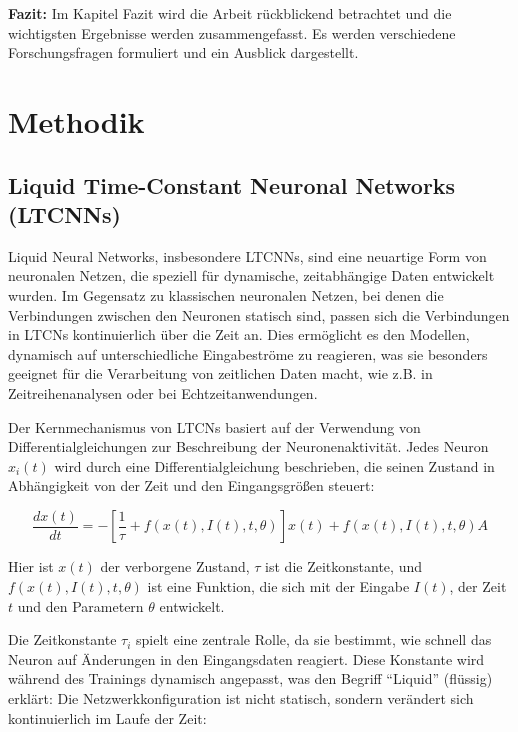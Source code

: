 \documentclass[11pt,ngerman,a4paper,]{article}
\begin{document}
\textbf{Fazit:} Im Kapitel Fazit wird die Arbeit rückblickend betrachtet und die wichtigsten Ergebnisse werden zusammengefasst. Es werden verschiedene Forschungsfragen formuliert und ein Ausblick dargestellt.

\clearpage
\newpage

\section{Methodik}\label{methodik}

\subsection{Liquid Time-Constant Neuronal Networks (LTCNNs)}\label{liquid-time-constant-neuronal-networks-ltcnns}

Liquid Neural Networks, insbesondere LTCNNs, sind eine neuartige Form von neuronalen Netzen, die speziell für dynamische, zeitabhängige Daten entwickelt wurden. Im Gegensatz zu klassischen neuronalen Netzen, bei denen die Verbindungen zwischen den Neuronen statisch sind, passen sich die Verbindungen in LTCNs kontinuierlich über die Zeit an. Dies ermöglicht es den Modellen, dynamisch auf unterschiedliche Eingabeströme zu reagieren, was sie besonders geeignet für die Verarbeitung von zeitlichen Daten macht, wie z.B. in Zeitreihenanalysen oder bei Echtzeitanwendungen.

Der Kernmechanismus von LTCNs basiert auf der Verwendung von Differentialgleichungen zur Beschreibung der Neuronenaktivität. Jedes Neuron \(x_i(t)\) wird durch eine Differentialgleichung beschrieben, die seinen Zustand in Abhängigkeit von der Zeit und den Eingangsgrößen steuert:

\[
\frac{dx(t)}{dt} = -\left[\frac{1}{\tau} + f(x(t), I(t), t, \theta)\right] x(t) + f(x(t), I(t), t, \theta)A
\]

Hier ist \(x(t)\) der verborgene Zustand, \(\tau\) ist die Zeitkonstante, und \(f(x(t), I(t), t, \theta)\) ist eine Funktion, die sich mit der Eingabe \(I(t)\), der Zeit \(t\) und den Parametern \(\theta\) entwickelt.

Die Zeitkonstante \(\tau_i\) spielt eine zentrale Rolle, da sie bestimmt, wie schnell das Neuron auf Änderungen in den Eingangsdaten reagiert. Diese Konstante wird während des Trainings dynamisch angepasst, was den Begriff ``Liquid'' (flüssig) erklärt: Die Netzwerkkonfiguration ist nicht statisch, sondern verändert sich kontinuierlich im Laufe der Zeit:
\end{document}
